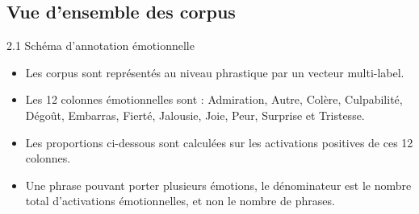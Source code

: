 \documentclass[aspectratio=169,10pt,xcolor=table]{beamer}
\begin{document}
\subsection{Vue d'ensemble des corpus}

\begin{frame}{2.1 Schéma d'annotation émotionnelle}
\small
\begin{itemize}
  \item Les corpus sont représentés au niveau phrastique par un vecteur multi-label.
  \item Les 12 colonnes émotionnelles sont : Admiration, Autre, Colère, Culpabilité, Dégoût, Embarras, Fierté, Jalousie, Joie, Peur, Surprise et Tristesse.
  \item Les proportions ci-dessous sont calculées sur les activations positives de ces 12 colonnes.
  \item Une phrase pouvant porter plusieurs émotions, le dénominateur est le nombre total d'activations émotionnelles, et non le nombre de phrases.
\end{itemize}
\end{frame}
\end{document}
